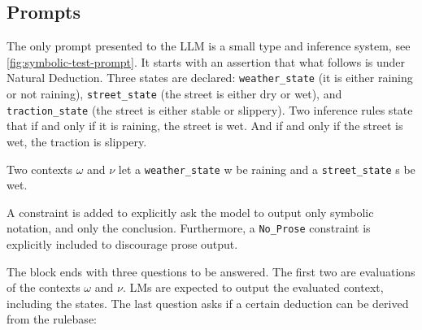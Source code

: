 \subsection{Prompts}
The only prompt presented to the LLM is a small type and inference system, see \autoref{fig:symbolic-test-prompt}.
It starts with an assertion that what follows is under Natural Deduction.
Three states are declared: \texttt{weather\_state} (it is either raining or not raining), 
\texttt{street\_state} (the street is either dry or wet), and \texttt{traction\_state} 
(the street is either stable or slippery). Two inference rules state that if and
only if it is raining, the street is wet. And if and only if the street is wet,
the traction is slippery.

Two contexts $\omega$ and $\nu$ let a \texttt{weather\_state} w be raining and a \texttt{street\_state} s be wet.

A constraint is added to explicitly ask the model to output only symbolic notation, and only the conclusion.
Furthermore, a \texttt{No\_Prose} constraint is explicitly included to discourage prose output.

The block ends with three questions to be answered. The first two are evaluations of the contexts $\omega$ and $\nu$. 
LMs are expected to output the evaluated context, including the states. The last question asks if a certain deduction can be derived from the rulebase:

